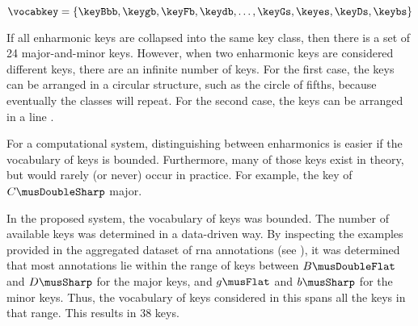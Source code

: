 
\begin{equation}
    \vocabkey = \{ \keyBbb, \keygb, \keyFb, \keydb, \dotsc,
    \keyGs, \keyes, \keyDs, \keybs \}
\end{equation}

If all enharmonic keys are collapsed into the same key
class, then there is a set of 24 major-and-minor keys.
However, when two enharmonic keys are considered different
keys, there are an infinite number of keys. For the first
case, the keys can be arranged in a circular structure, such
as the circle of fifths, because eventually the classes will
repeat. For the second case, the keys can be arranged in a
line \parencite{temperley2000line}.

For a computational system, distinguishing between
enharmonics is easier if the vocabulary of keys is bounded.
Furthermore, many of those keys exist in theory, but would
rarely (or never) occur in practice. For example, the key of
$C\musDoubleSharp$ major.

In the proposed system, the vocabulary of keys was bounded.
The number of available keys was determined in a data-driven
way. By inspecting the examples provided in the aggregated
dataset of \gls{rna} annotations (see
), it was determined
that most annotations lie within the range of keys between
$B\musDoubleFlat$ and $D\musSharp$ for the major keys, and
$g\musFlat$ and $b\musSharp$ for the minor keys. Thus, the
vocabulary of keys considered in this \thesisdiss{} spans
all the keys in that range. This results in 38 keys.
